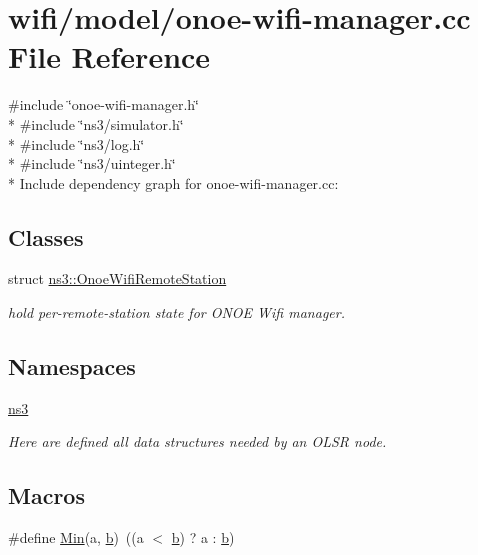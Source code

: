\hypertarget{onoe-wifi-manager_8cc}{}\section{wifi/model/onoe-\/wifi-\/manager.cc File Reference}
\label{onoe-wifi-manager_8cc}
{\ttfamily \#include \char`\"{}onoe-\/wifi-\/manager.\+h\char`\"{}}\\*
{\ttfamily \#include \char`\"{}ns3/simulator.\+h\char`\"{}}\\*
{\ttfamily \#include \char`\"{}ns3/log.\+h\char`\"{}}\\*
{\ttfamily \#include \char`\"{}ns3/uinteger.\+h\char`\"{}}\\*
Include dependency graph for onoe-\/wifi-\/manager.cc\+:
\subsection*{Classes}
\begin{DoxyCompactItemize}
\item 
struct \hyperlink{structns3_1_1OnoeWifiRemoteStation}{ns3\+::\+Onoe\+Wifi\+Remote\+Station}
\begin{DoxyCompactList}\small\item\em hold per-\/remote-\/station state for O\+N\+OE Wifi manager. \end{DoxyCompactList}\end{DoxyCompactItemize}
\subsection*{Namespaces}
\begin{DoxyCompactItemize}
\item 
 \hyperlink{namespacens3}{ns3}
\begin{DoxyCompactList}\small\item\em Here are defined all data structures needed by an O\+L\+SR node. \end{DoxyCompactList}\end{DoxyCompactItemize}
\subsection*{Macros}
\begin{DoxyCompactItemize}
\item 
\#define \hyperlink{onoe-wifi-manager_8cc_a9e04209162ea72f9985338596262b657}{Min}(a,  \hyperlink{lte__pathloss_8m_a21ad0bd836b90d08f4cf640b4c298e7c}{b})~((a $<$ \hyperlink{lte__pathloss_8m_a21ad0bd836b90d08f4cf640b4c298e7c}{b}) ? a \+: \hyperlink{lte__pathloss_8m_a21ad0bd836b90d08f4cf640b4c298e7c}{b})
\end{DoxyCompactItemize}
